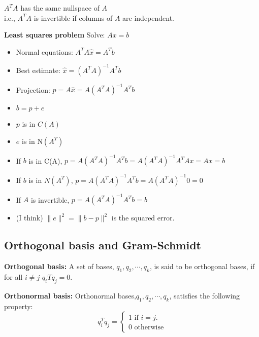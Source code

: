 \begin{mdframed}[backgroundcolor=gray!20]
$A^TA$ has the same nullspace of $A$\\
i.e., $A^TA$ is invertible if columns of $A$ are independent.
\end{mdframed}

\vspace{12pt}

\textbf{Least squares problem}
Solve: $Ax =b$\\
\begin{itemize}
\item Normal equations: $A^TA\hat{x} = A^Tb$\\
\item Best estimate: $\hat{x} = (A^TA)^{-1}A^Tb$\\
\item Projection: $p = A\hat{x} = A(A^TA)^{-1}A^Tb$\\
\item $b = p + e$\\
\item $p$ is in $C(A)$\\
\item $e$ is in N$(A^T)$\\
\item If $b$ is in C(A), $p = A(A^TA)^{-1}A^Tb = A(A^TA)^{-1}A^TAx = Ax = b$
\item If $b$ is in $N(A^T)$, $p = A(A^TA)^{-1}A^Tb = A(A^TA)^{-1}0 = 0$
\item If $A$ is invertible, $p = A(A^TA)^{-1}A^Tb = b$
\item (I think) $\|e\|^2 = \|b-p\|^2$ is the squared error.

\end{itemize}


\subsection{Orthogonal basis and Gram-Schmidt}

\textbf{Orthogonal basis:}
A set of bases, $q_1, q_2, \cdots, q_k$, is said to be orthogonal bases, 
if for all $i \neq j$ $q_iTq_j = 0$.

\textbf{Orthonormal basis:} Orthonormal bases,$q_1, q_2, \cdots, q_k$, satisfies the following property:\\

$$
	q_i^Tq_j = 
	\begin{cases}
		1 \text{ if } i = j.\\
		0 \text{ otherwise} \end{cases}	
$$

